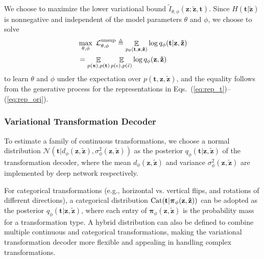\documentclass[10pt,journal,compsoc,twoside]{IEEEtran}
\begin{document}
We choose to maximize the lower variational bound $\tilde I_{\theta,\phi}(\mathbf z;\mathbf {\tilde z},\mathbf t)$. Since $H(\mathbf t|\mathbf {\tilde z})$ is nonnegative and independent of the model parameters $\theta$ and $\phi$, we choose to solve
\begin{equation}\label{eq:var}
\begin{aligned}
&\max\limits_{\theta,\phi}~\mathcal L^{\rm unsup}_{\theta,\phi} \triangleq \mathop\mathbb E\limits_{p_\theta(\mathbf t,\mathbf z,\mathbf {\tilde z})}\log q_\phi(\mathbf t|\mathbf z,\mathbf {\tilde z})\\
&=\mathop\mathbb E\limits_{p(\mathbf x),p(\mathbf t)} \mathop\mathbb E\limits_{p(\epsilon),p(\tilde\epsilon)}\log q_\phi(\mathbf z,\mathbf {\tilde z})\\
\end{aligned}
\end{equation}
to learn $\theta$ and $\phi$ under the expectation over $p(\mathbf t, \mathbf z, \mathbf {\tilde z})$, and the equality follows from the generative process for the representations in Eqs.~(\ref{eq:rep_t})--(\ref{eq:rep_ori}).

\subsubsection{Variational Transformation Decoder}\label{sec:var_decoder}

To estimate a family of continuous transformations, we choose a normal distribution $\mathcal N(\mathbf t|d_\phi(\mathbf z,\mathbf {\tilde z}),\sigma^2_\phi(\mathbf z,\mathbf {\tilde z}))$ as the posterior $q_\phi(\mathbf t|\mathbf z,\mathbf {\tilde z})$ of the transformation decoder, where the mean $d_\phi(\mathbf z,\mathbf {\tilde z})$ and variance $\sigma^2_\phi(\mathbf z, \mathbf {\tilde z})$ are implemented by deep network respectively.

For categorical transformations (e.g., horizontal vs. vertical flips, and rotations of different directions), a categorical distribution ${\rm Cat}(\mathbf t|\boldsymbol\pi_\phi(\mathbf z,\mathbf {\tilde z}))$ can be adopted as the posterior $q_\phi(\mathbf t|\mathbf z,\mathbf {\tilde z})$, where each entry of $\boldsymbol\pi_\phi(\mathbf z,\mathbf {\tilde z})$ is the probability mass for a transformation type. A hybrid distribution can also be defined to combine multiple continuous and categorical transformations, making the variational transformation decoder more flexible and appealing in handling complex transformations.
\end{document}
